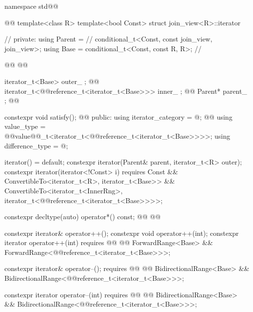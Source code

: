 \begin{codeblock}
namespace std@@ { @@
template<class R>
  template<bool Const>
  struct join_view<R>::iterator { // \expos
  private:
    using Parent =                                            // \expos
      conditional_t<Const, const join_view, join_view>;
    using Base   = conditional_t<Const, const R, R>;          // \expos

    @@
      @@

    iterator_t<Base> outer_ {};                               @\newtxt{// \expos}@
    iterator_t<@@reference_t<iterator_t<Base>>> inner_ {}; @\newtxt{// \expos}@
    Parent* parent_ {};                                       @\newtxt{// \expos}@

    constexpr void satisfy();                                 @\newtxt{// \expos}@
  public:
    using iterator_category = @\seebelownc@;
    @@
    using value_type = @@value@@_t<iterator_t<@@reference_t<iterator_t<Base>>>>;
    using difference_type = @\seebelownc@;

    iterator() = default;
    constexpr iterator(Parent& parent, iterator_t<R> outer);
    constexpr iterator(iterator<!Const> i) requires Const &&
      ConvertibleTo<iterator_t<R>, iterator_t<Base>> &&
      ConvertibleTo<iterator_t<InnerRng>,
        iterator_t<@@reference_t<iterator_t<Base>>>>;

    constexpr decltype(auto) operator*() const;
    @@
      @@

    constexpr iterator& operator++();
    constexpr void operator++(int);
    constexpr iterator operator++(int)
      requires @@
        @@ ForwardRange<Base> &&
        ForwardRange<@@reference_t<iterator_t<Base>>>;

    constexpr iterator& operator--();
      requires @@
        @@ BidirectionalRange<Base> &&
        BidirectionalRange<@@reference_t<iterator_t<Base>>>;

    constexpr iterator operator--(int)
      requires @@
        @@ BidirectionalRange<Base> &&
        BidirectionalRange<@@reference_t<iterator_t<Base>>>;

}}
\end{codeblock}

